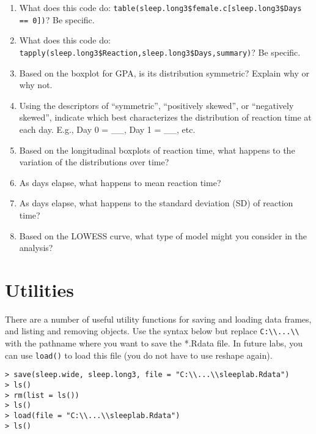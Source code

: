 \documentclass[]{article}
\begin{document}
\begin{enumerate}[resume]
\item What does this code do: \texttt{table(sleep.long3\$female.c[sleep.long3\$Days == 0])}? Be specific.
\item What does this code do: \texttt{tapply(sleep.long3\$Reaction,sleep.long3\$Days,summary)}? Be specific.
\item Based on the boxplot for GPA, is its distribution symmetric? Explain why or why not.
\item Using the descriptors of ``symmetric'', ``positively skewed'', or ``negatively skewed'', indicate which best characterizes the distribution of reaction time at each day. E.g., Day 0 =
    \_\_, Day 1 = \_\_, etc.
\item Based on the longitudinal boxplots of reaction time, what happens to the variation of the distributions over time?
\item As days elapse, what happens to mean reaction time?
\item As days elapse, what happens to the standard deviation (SD) of reaction time?
\item Based on the LOWESS curve, what type of model might you consider in the analysis?
\end{enumerate}

\pagebreak
%
%

\section*{Utilities}

\noindent There are a number of useful utility functions for saving and loading data frames, and listing and removing objects. Use the syntax below but replace \verb,C:\\...\\, with the pathname where you want to save the *.Rdata file. In future labs, you can use \texttt{load()} to load this file (you do not have to use reshape again).

\begin{verbatim}
> save(sleep.wide, sleep.long3, file = "C:\\...\\sleeplab.Rdata")
> ls()
> rm(list = ls())
> ls()
> load(file = "C:\\...\\sleeplab.Rdata")
> ls()
\end{verbatim}
\end{document}
